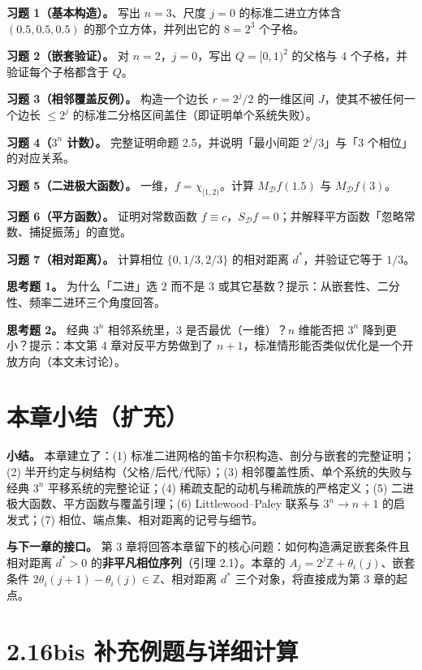\documentclass[a4paper,11pt,openany]{ctexbook}
\numberwithin{equation}{chapter}
\numberwithin{figure}{chapter}
\numberwithin{table}{chapter}
\begin{document}
\textbf{习题 1（基本构造）。} 写出 $n=3$、尺度 $j=0$ 的标准二进立方体含 $(0.5,0.5,0.5)$ 的那个立方体，并列出它的 $8=2^3$ 个子格。

\textbf{习题 2（嵌套验证）。} 对 $n=2$，$j=0$，写出 $Q=[0,1)^2$ 的父格与 $4$ 个子格，并验证每个子格都含于 $Q$。

\textbf{习题 3（相邻覆盖反例）。} 构造一个边长 $r=2^j/2$ 的一维区间 $J$，使其不被任何一个边长 $\le 2^j$ 的标准二分格区间盖住（即证明单个系统失败）。

\textbf{习题 4（$3^n$ 计数）。} 完整证明命题 2.5，并说明「最小间距 $2^j/3$」与「$3$ 个相位」的对应关系。

\textbf{习题 5（二进极大函数）。} 一维，$f=\chi_{[1,2)}$。计算 $M_{\mathcal D}f(1.5)$ 与 $M_{\mathcal D}f(3)$。

\textbf{习题 6（平方函数）。} 证明对常数函数 $f\equiv c$，$S_{\mathcal D}f=0$；并解释平方函数「忽略常数、捕捉振荡」的直觉。

\textbf{习题 7（相对距离）。} 计算相位 $\{0,1/3,2/3\}$ 的相对距离 $d^*$，并验证它等于 $1/3$。

\textbf{思考题 1。} 为什么「二进」选 $2$ 而不是 $3$ 或其它基数？提示：从嵌套性、二分性、频率二进环三个角度回答。

\textbf{思考题 2。} 经典 $3^n$ 相邻系统里，$3$ 是否最优（一维）？$n$ 维能否把 $3^n$ 降到更小？提示：本文第 4 章对反平方势做到了 $n+1$，标准情形能否类似优化是一个开放方向（本文未讨论）。

\section{本章小结（扩充）}

\textbf{小结。} 本章建立了：(1) 标准二进网格的笛卡尔积构造、剖分与嵌套的完整证明；(2) 半开约定与树结构（父格/后代/代际）；(3) 相邻覆盖性质、单个系统的失败与经典 $3^n$ 平移系统的完整论证；(4) 稀疏支配的动机与稀疏族的严格定义；(5) 二进极大函数、平方函数与覆盖引理；(6) Littlewood–Paley 联系与 $3^n\to n+1$ 的启发式；(7) 相位、端点集、相对距离的记号与细节。

\textbf{与下一章的接口。} 第 3 章将回答本章留下的核心问题：如何构造满足嵌套条件且相对距离 $d^*>0$ 的\textbf{非平凡相位序列}（引理 2.1）。本章的 $A_j=2^j\mathbb Z+\theta_i(j)$、嵌套条件 $2\theta_i(j+1)-\theta_i(j)\in\mathbb Z$、相对距离 $d^*$ 三个对象，将直接成为第 3 章的起点。

\section{2.16bis 补充例题与详细计算}
\end{document}

